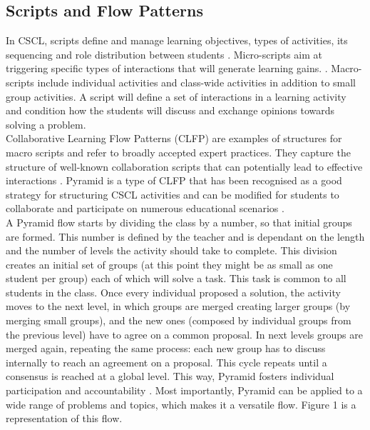 \subsection{Scripts and Flow Patterns}
In CSCL, scripts define and manage learning objectives, types of activities, its sequencing and role distribution between students \cite{Kollar2006-lk}. Micro-scripts aim at triggering specific types of interactions that will generate learning gains. \cite{Dillenbourg2013-kx}. Macro-scripts \cite{Dillenbourg2008-kt} include individual activities and class-wide activities in addition to small group activities. A script will define a set of interactions in a learning activity and condition how the students will discuss and exchange opinions towards solving a problem.\\
Collaborative Learning Flow Patterns (CLFP) are examples of structures for macro scripts and refer to broadly accepted expert practices. They capture the structure of well-known collaboration scripts that can potentially lead to effective interactions \cite{Hernandez-leo2006-lv}. Pyramid is a type of CLFP that has been recognised as a good strategy for structuring CSCL activities \cite{Davis_undated-sg} and can be modified for students to collaborate and participate on numerous educational scenarios \cite{Hernandez-leo2006-lv}.\\
A Pyramid flow starts by dividing the class by a number, so that initial groups are formed. This number is defined by the teacher and is dependant on the length and the number of levels the activity should take to complete. This division creates an initial set of groups (at this point they might be as small as one student per group) each of which will solve a task. This task is common to all students in the class. Once every individual proposed a solution, the activity moves to the next level, in which groups are merged creating larger groups (by merging small groups), and the new ones (composed by individual groups from the previous level) have to agree on a common proposal. In next levels groups are merged again, repeating the same process: each new group has to discuss internally to reach an agreement on a proposal. This cycle repeats until a consensus is reached at a global level. This way, Pyramid fosters individual participation and accountability \cite{Hernandez-leo2006-lv}. Most importantly, Pyramid can be applied to a wide range of problems and topics, which makes it a versatile flow. Figure 1 is a representation of this flow.
